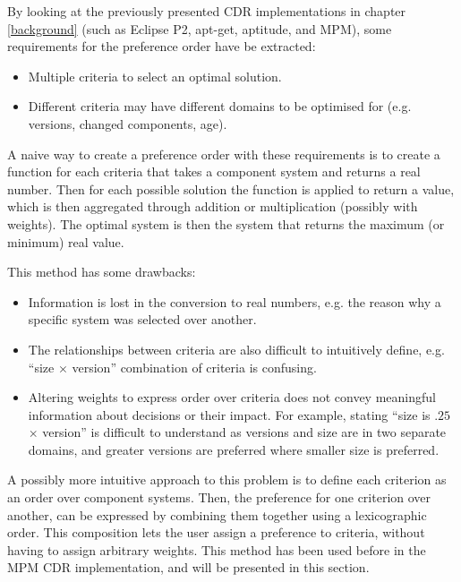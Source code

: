 By looking at the previously presented CDR implementations in chapter \ref{background} (such as Eclipse P2, apt-get, aptitude, and MPM), some requirements for the preference order have be extracted:
\begin{itemize}
  \item Multiple criteria to select an optimal solution.
  \item Different criteria may have different domains to be optimised for (e.g. versions, changed components, age).
\end{itemize} 

A naive way to create a preference order with these requirements is to create a function for each criteria that takes a component system and returns a real number.
Then for each possible solution the function is applied to return a value, which is then aggregated through addition or multiplication (possibly with weights).
The optimal system is then the system that returns the maximum (or minimum) real value. 

This method has some drawbacks:
\begin{itemize}
  \item Information is lost in the conversion to real numbers, e.g. the reason why a specific system was selected over another.
  \item The relationships between criteria are also difficult to intuitively define, e.g. ``size $\times$ version'' combination of criteria is confusing.
  \item Altering weights to express order over criteria does not convey meaningful information about decisions or their impact.
  For example, stating ``size is $.25$ $\times$ version'' is difficult to understand as versions and size are in two separate domains, 
and greater versions are preferred where smaller size is preferred.
\end{itemize}

A possibly more intuitive approach to this problem is to define each criterion as an order over component systems.
Then, the preference for one criterion over another, can be expressed by combining them together using a lexicographic order.
This composition lets the user assign a preference to criteria, without having to assign arbitrary weights.
This method has been used before in the MPM \citep{abate2011} CDR implementation, and will be presented in this section.

